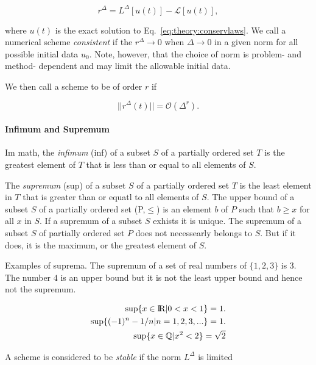 \begin{equation}
r^{\Delta} = L^{\Delta}[u(t)] - \mathcal{L}[u(t)],
\end{equation}

where $u(t)$ is the exact solution to Eq.~\eqref{eq:theory:conservlaws}. We call a numerical scheme \textit{consistent} if the $r^{\Delta}\rightarrow 0$ when $\Delta\rightarrow 0$ in a given norm for all possible initial data $u_0$. Note, however, that the choice of norm is problem- and method- dependent and may limit the allowable initial data. 

We then call a scheme to be of order $r$ if 

\begin{equation}
|| r^{\Delta}(t) || = \mathcal{O}(\Delta^r).
\end{equation}


\paragraph{Infimum and Supremum}

Im math, the \textit{infimum} (inf) of a subset $S$ of a partially ordered set $T$ is the greatest element of $T$ that is less than or equal to all elements of $S$. 

The \textit{supremum} (sup) of a subset $S$ of a partially ordered set $T$ is the least element in $T$ that is greater than or equatl to all elements of $S$. The upper bound of a subset $S$ of a partially ordered set (P,$\leq$) is an element $b$ of $P$ such that $b\geq x$ for all $x$ in $S$. If a supremum of a subset $S$ exhists it is unique. The supremum of a subset $S$ of partially ordered set $P$ does not necessearly belongs to $S$. But if it does, it is the maximum, or the greatest element of $S$. 

Examples of suprema.
The supremum of a set of real numbers of $\{1,2,3\}$ is $3$. The number $4$ is an upper bound but it is not the least upper bound and hence not the supremum. 

\begin{align}
\sup\{x\in\text{I\!R}|0<x<1\} = 1. \\
\sup\{(-1)^n - 1/n | n = 1,2,3,... \} = 1. \\
\sup\{x\in\mathbb{Q} | x^2 < 2\} = \sqrt{2}
\end{align}



A scheme is considered to be \textit{stable} if the norm $L^{\Delta}$ is limited 

